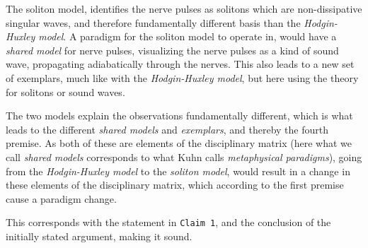 The soliton model, identifies the nerve pulses as solitons which are non-dissipative singular waves, and therefore fundamentally different basis than the \textit{Hodgin-Huxley model}. A paradigm for the soliton model to operate in, would have a \textit{shared model} for nerve pulses, visualizing the nerve pulses as a kind of sound wave, propagating adiabatically through the nerves. This also leads to a new set of exemplars, much like with the \textit{Hodgin-Huxley model}, but here using the theory for solitons or sound waves.

The two models explain the observations fundamentally different, which is what leads to the different \textit{shared models} and \textit{exemplars}, and thereby the fourth premise. As both of these are elements of the disciplinary matrix (here what we call \textit{shared models} corresponds to what Kuhn calls \textit{metaphysical paradigms}), going from the \textit{Hodgin-Huxley model} to the \textit{soliton model}, would result in a change in these elements of the disciplinary matrix, which according to the first premise cause a paradigm change. 

This corresponds with the statement in \texttt{Claim 1}, and the conclusion of the initially stated argument, making it sound.